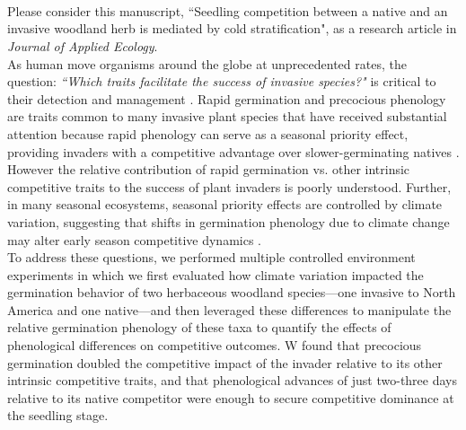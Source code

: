 \documentclass[11.5 pt]{article}
\begin{document}


\def\labelitemi{--}
\parindent=24pt
\\\\
\\
\vspace{1.5ex}

\noindent Please consider this manuscript, ``Seedling competition between a native and an invasive  
woodland herb is mediated by cold stratification", as a research article in \textit{Journal of Applied Ecology}.\\

\noindent As human move organisms around the globe at unprecedented rates, the question:  \textit{``Which traits facilitate the success of invasive species?"} is critical to their detection and management \citep{Fournier2019}. Rapid germination and precocious phenology are traits common to many invasive plant species that have received substantial attention because rapid phenology can serve as a seasonal priority effect, providing invaders with a competitive advantage over slower-germinating natives \citep{Wainwright_2011}. However the relative contribution of rapid germination vs. other intrinsic competitive traits to the success of plant invaders is poorly understood. Further, in many seasonal ecosystems, seasonal priority effects are controlled by climate variation, suggesting that shifts in germination phenology due to climate change may alter early season competitive dynamics \citep{Rudolf:2019aa}.\\

\noindent To address these questions, we performed multiple controlled environment experiments in which we first evaluated how climate variation impacted the germination behavior of two herbaceous woodland species---one invasive to North America and one native---and then leveraged these differences to manipulate the relative germination phenology of these taxa to quantify the effects of phenological differences on competitive outcomes. W found that precocious germination doubled the competitive impact of the invader relative to its other intrinsic competitive traits, and that phenological advances of just two-three days relative to its native competitor were enough to secure competitive dominance at the seedling stage.\\
\end{document}
